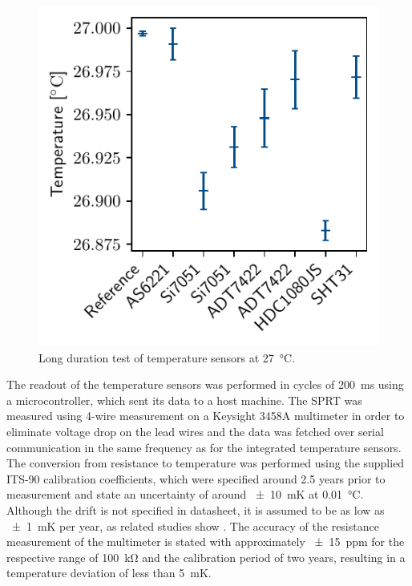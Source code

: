 \begin{figure}
    \centering
    \includegraphics{graphs/tempsensors_stability.pdf}
    \caption{Long duration test of temperature sensors at \qty{27}{\celsius}.}
    \label{g:temp_stability}
\end{figure}
The readout of the temperature sensors was performed in cycles of \qty{200}{\ms} using a microcontroller, which sent its data to a host machine. The \gls{SPRT} was measured using 4-wire measurement on a Keysight 3458A multimeter in order to eliminate voltage drop on the lead wires and the data was fetched over serial communication in the same frequency as for the integrated temperature sensors. The conversion from resistance to temperature was performed using the supplied ITS-90 calibration coefficients, which were specified around 2.5 years prior to measurement and state an uncertainty of around \qty{\pm 10}{\milli\kelvin} at \qty{0.01}{\celsius}. Although the drift is not specified in datasheet, it is assumed to be as low as \qty{\pm 1}{\milli \kelvin} per year, as related studies show \autocite{tavenerPlatinumResistanceThermometers2013}. The accuracy of the resistance measurement of the multimeter is stated with approximately \qty{\pm 15}{ppm} for the respective range of \qty{100}{\kilo\ohm} and the calibration period of two years, resulting in a temperature deviation of less than \qty{5}{\milli \kelvin}.

